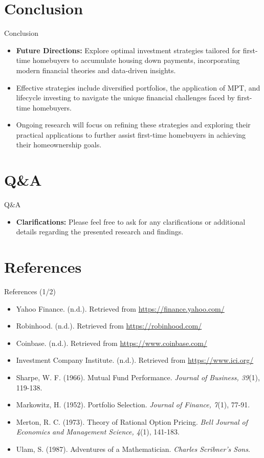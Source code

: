 \documentclass{beamer}
\begin{document}
\section{Conclusion}
\begin{frame}{Conclusion}
    \begin{itemize}
        \item \textbf{Future Directions:} Explore optimal investment strategies tailored for first-time homebuyers to accumulate housing down payments, incorporating modern financial theories and data-driven insights.
        \item Effective strategies include diversified portfolios, the application of MPT, and lifecycle investing to navigate the unique financial challenges faced by first-time homebuyers.
        \item Ongoing research will focus on refining these strategies and exploring their practical applications to further assist first-time homebuyers in achieving their homeownership goals.
    \end{itemize}
\end{frame}

\section{Q\&A}
\begin{frame}{Q\&A}
    \begin{itemize}
        \item \textbf{Clarifications:} Please feel free to ask for any clarifications or additional details regarding the presented research and findings.
    \end{itemize}
\end{frame}

\section{References}
\begin{frame}{References (1/2)}
    \begin{itemize}
        \item Yahoo Finance. (n.d.). Retrieved from \url{https://finance.yahoo.com/}
        \item Robinhood. (n.d.). Retrieved from \url{https://robinhood.com/}
        \item Coinbase. (n.d.). Retrieved from \url{https://www.coinbase.com/}
        \item Investment Company Institute. (n.d.). Retrieved from \url{https://www.ici.org/}
        \item Sharpe, W. F. (1966). Mutual Fund Performance. \textit{Journal of Business, 39}(1), 119-138.
        \item Markowitz, H. (1952). Portfolio Selection. \textit{Journal of Finance, 7}(1), 77-91.
        \item Merton, R. C. (1973). Theory of Rational Option Pricing. \textit{Bell Journal of Economics and Management Science, 4}(1), 141-183.
        \item Ulam, S. (1987). Adventures of a Mathematician. \textit{Charles Scribner's Sons}.
    \end{itemize}
\end{frame}
\end{document}
